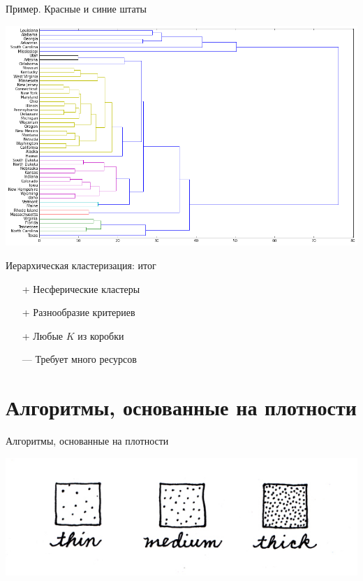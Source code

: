 \documentclass[aspectratio=169]{beamer}
\begin{document}
\begin{frame}{Пример. Красные и синие штаты}

\begin{center}
\includegraphics[height=0.9\textheight]{images/states_dendro.png}
\end{center}

\end{frame}

\begin{frame}{Иерархическая кластеризация: итог}

\begin{itemize}
\item[+] Несферические кластеры
\item[+] Разнообразие критериев
\item[+] Любые $K$ из коробки
\item[---] Требует много ресурсов
\end{itemize}

\end{frame}


\section{Алгоритмы, основанные на плотности}


\begin{frame}

\begin{center}
{\Large Алгоритмы, основанные на плотности}

\vspace{1em}
\includegraphics[scale=2.0]{images/density.jpg}
\end{center}

\end{frame}
\end{document}

